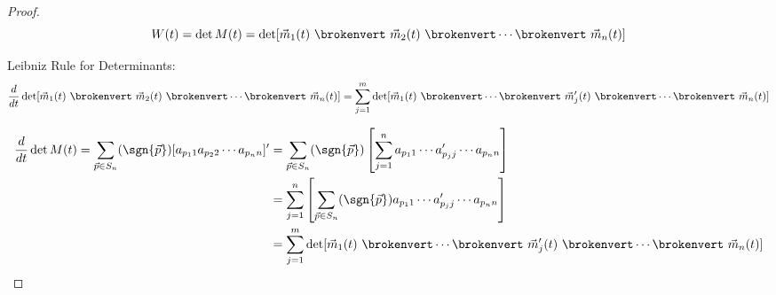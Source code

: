 \documentclass[12pt]{article}
\begin{document}
\begin{proof}
\[ W(t) = \det{M(t)} = \det[\vec{m}_1(t) \ \brokenvert \ \vec{m}_2(t) \ \brokenvert \cdots \brokenvert \ \vec{m}_n(t)] \]

Leibniz Rule for Determinants:
\[ \frac{d}{dt} \det[\vec{m}_1(t) \ \brokenvert \ \vec{m}_2(t) \ \brokenvert \cdots \brokenvert \ \vec{m}_n(t)] = \sum_{j=1}^m\det[\vec{m}_1(t) \ \brokenvert \cdots \brokenvert \ \vec{m}'_j(t) \ \brokenvert \cdots \brokenvert \ \vec{m}_n(t)] \]

\[ 
\begin{aligned}
  \frac{d}{dt}\det{M(t)} = \sum_{\vec{p} \in S_n}(\sgn{\vec{p}})[a_{p_11}a_{p_22}\cdots a_{p_nn}]' &= \sum_{\vec{p} \in S_n}(\sgn{\vec{p}})\left[\sum_{j=1}^n a_{p_11}\cdots a'_{p_jj}\cdots a_{p_nn}\right] \\
  &= \sum_{j=1}^n\left[\sum_{\vec{p}\in S_n}(\sgn{\vec{p}}) a_{p_11}\cdots a'_{p_jj}\cdots a_{p_nn}\right] \\
  &= \sum_{j=1}^m\det[\vec{m}_1(t) \ \brokenvert \cdots \brokenvert \ \vec{m}'_j(t) \ \brokenvert \cdots \brokenvert \ \vec{m}_n(t)]
\end{aligned}
\]


\end{proof}
\end{document}
